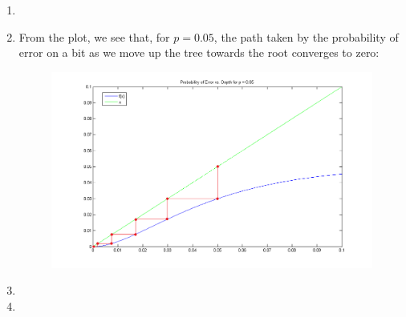 \documentclass[11pt]{article}
\begin{document}
\begin{enumerate}
\begin{enumerate}
        \item


        \item
            From the plot, we see that, for $p = 0.05$, the path taken by the probability of error on a bit as we move up the tree towards the root converges to zero:
        \begin{figure}[H]
            \begin{center}
                \includegraphics[width = \textwidth]{figure_k.png}
                \caption{}
            \end{center}
        \end{figure}


        \item


        \item


\end{enumerate}
\end{enumerate}
\end{document}
